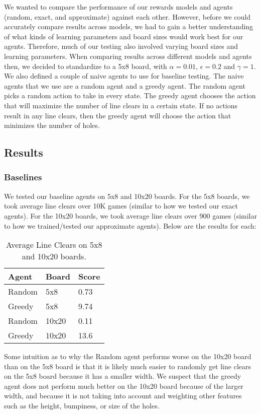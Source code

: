 \documentclass[10pt]{article}
\begin{document}
\bigskip

We wanted to compare the performance of our rewards models and agents (random, exact, and approximate) against each other. However, before we could accurately compare results across models, we had to gain a better understanding of what kinds of learning parameters and board sizes would work best for our agents. Therefore, much of our testing also involved varying board sizes and learning parameters. When comparing results across different models and agents then, we decided to standardize to a 5x8 board, with $\alpha=0.01$, $\epsilon=0.2$ and $\gamma=1$. We also defined a couple of naive agents to use for baseline testing. The naive agents that we use are a random agent and a greedy agent. The random agent picks a random action to take in every state. The greedy agent chooses the action that will maximize the number of line clears in a certain state. If no actions result in any line clears, then the greedy agent will choose the action that minimizes the number of holes.

\subsection{Results}

\subsubsection{Baselines}
We tested our baseline agents on 5x8 and 10x20 boards. For the 5x8 boards, we took average line clears over 10K games (similar to how we tested our exact agents). For the 10x20 boards, we took average line clears over 900 games (similar to how we trained/tested our approximate agents). Below are the results for each:
\begin{table}[H]
  \centering
  \begin{tabular}{lll}
    \toprule
    Agent & Board & Score \\
    \midrule
    Random & 5x8 & 0.73\\
    Greedy & 5x8 & 9.74\\
    Random & 10x20 & 0.11\\
    Greedy & 10x20 & 13.6\\
    \bottomrule
  \end{tabular}
  \caption{Average Line Clears on 5x8 and 10x20 boards.}
\end{table}
Some intuition as to why the Random agent performs worse on the 10x20 board than on the 5x8 board is that it is likely much easier to randomly get line clears on the 5x8 board because it has a smaller width. We suspect that the greedy agent does not perform much better on the 10x20 board because of the larger width, and because it is not taking into account and weighting other features such as the height, bumpiness, or size of the holes.
\end{document}
